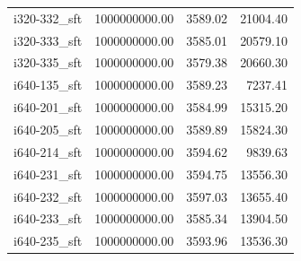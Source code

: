 \begin{tabular}{lrrr}
i320-332\_sft & 1000000000.00 &           3589.02 &    21004.40 \\
i320-333\_sft & 1000000000.00 &           3585.01 &    20579.10 \\
i320-335\_sft & 1000000000.00 &           3579.38 &    20660.30 \\
i640-135\_sft & 1000000000.00 &           3589.23 &     7237.41 \\
i640-201\_sft & 1000000000.00 &           3584.99 &    15315.20 \\
i640-205\_sft & 1000000000.00 &           3589.89 &    15824.30 \\
i640-214\_sft & 1000000000.00 &           3594.62 &     9839.63 \\
i640-231\_sft & 1000000000.00 &           3594.75 &    13556.30 \\
i640-232\_sft & 1000000000.00 &           3597.03 &    13655.40 \\
i640-233\_sft & 1000000000.00 &           3585.34 &    13904.50 \\
i640-235\_sft & 1000000000.00 &           3593.96 &    13536.30 \\
\bottomrule
\end{tabular}
